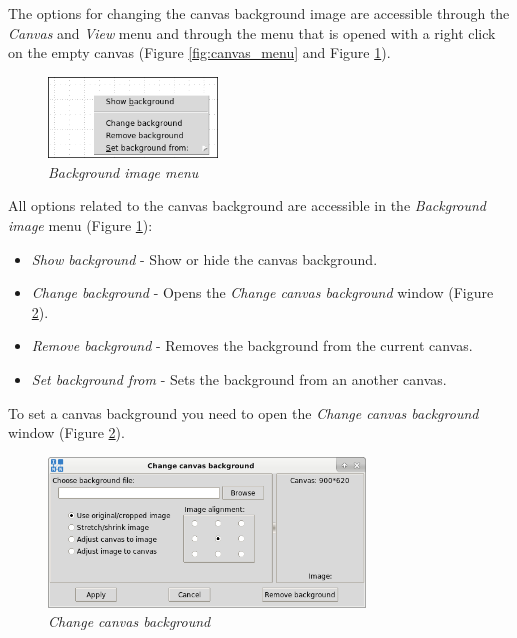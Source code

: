 The options for changing the canvas background image are accessible through the
\emph{Canvas} and \emph{View} menu and through the menu that is opened with a
right click on the empty canvas (Figure \ref{fig:canvas_menu} and Figure
\ref{fig:background_image_menu}).

\begin{figure}[H]
	\centering
	\vspace{10pt}
	\includegraphics[width=0.4\textwidth]{./images/background_image_menu.png}
	\caption{\emph{Background image menu}}
	\label{fig:background_image_menu}
\end{figure}

All options related to the canvas background are accessible in the
\emph{Background image} menu (Figure \ref{fig:background_image_menu}):
\begin{itemize}
    \item \emph{Show background} - Show or hide the canvas background.
    \item \emph{Change background} - Opens the \emph{Change canvas background}
window (Figure \ref{fig:change_canvas_background}).
    \item \emph{Remove background} - Removes the background from the current
canvas.
    \item \emph{Set background from} - Sets the background from an another
canvas.
\end{itemize}

To set a canvas background you need to open the \emph{Change canvas background}
window (Figure \ref{fig:change_canvas_background}).

\begin{figure}[H]
	\centering
	\vspace{10pt}
	\includegraphics[width=0.75\textwidth]{./images/change_canvas_background.png}
	\caption{\emph{Change canvas background}}
	\label{fig:change_canvas_background}
\end{figure}

